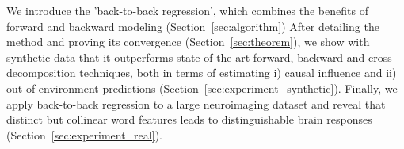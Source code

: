 We introduce the 'back-to-back regression', which combines the benefits of forward and backward modeling (Section~\ref{sec:algorithm}) After detailing the method and proving its convergence (Section~\ref{sec:theorem}), we show with synthetic data that it outperforms state-of-the-art forward, backward and cross-decomposition techniques, both in terms of estimating i) causal influence and ii) out-of-environment predictions (Section~\ref{sec:experiment_synthetic}). Finally, we apply back-to-back regression to a large neuroimaging dataset and reveal that distinct but collinear word features leads to distinguishable brain responses (Section~\ref{sec:experiment_real}).
